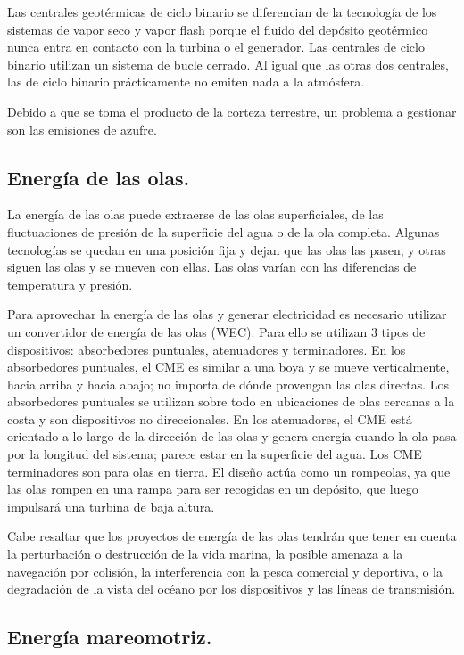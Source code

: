 \documentclass[runningheads]{llncs}
\begin{document}
Las centrales geotérmicas de ciclo binario se diferencian de la tecnología de los sistemas de vapor seco y vapor flash porque el fluido del depósito geotérmico nunca entra en contacto con la turbina o el generador. Las centrales de ciclo binario utilizan un sistema de bucle cerrado. Al igual que las otras dos centrales, las de ciclo binario prácticamente no emiten nada a la atmósfera.

Debido a que se toma el producto de la corteza terrestre, un problema a gestionar son las emisiones de azufre.

\subsection{Energía de las olas.
}

La energía de las olas puede extraerse de las olas superficiales, de las fluctuaciones de presión de la superficie del agua o de la ola completa. Algunas tecnologías se quedan en una posición fija y dejan que las olas las pasen, y otras siguen las olas y se mueven con ellas. Las olas varían con las diferencias de temperatura y presión. 

Para aprovechar la energía de las olas y generar electricidad es necesario utilizar un convertidor de energía de las olas (WEC). Para ello se utilizan 3 tipos de dispositivos: absorbedores puntuales, atenuadores y terminadores. En los absorbedores puntuales, el CME es similar a una boya y se mueve verticalmente, hacia arriba y hacia abajo; no importa de dónde provengan las olas directas. Los absorbedores puntuales se utilizan sobre todo en ubicaciones de olas cercanas a la costa y son dispositivos no direccionales. En los atenuadores, el CME está orientado a lo largo de la dirección de las olas y genera energía cuando la ola pasa por la longitud del sistema; parece estar en la superficie del agua. Los CME terminadores son para olas en tierra. El diseño actúa como un rompeolas, ya que las olas rompen en una rampa para ser recogidas en un depósito, que luego impulsará una turbina de baja altura.

Cabe resaltar que los proyectos de energía de las olas tendrán que tener en cuenta la perturbación o destrucción de la vida marina, la posible amenaza a la navegación por colisión, la interferencia con la pesca comercial y deportiva, o la degradación de la vista del océano por los dispositivos y las líneas de transmisión.

\subsection{Energía mareomotriz.
}
\end{document}
